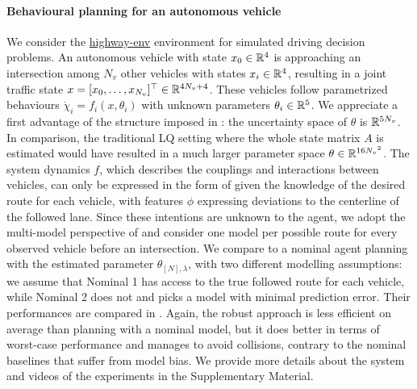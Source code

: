 \paragraph{Behavioural planning for an autonomous vehicle}
We consider the \href{https://github.com/eleurent/highway-env}{highway-env} environment \citep{highway-env} for simulated driving decision problems. An autonomous vehicle with state $x_0\in\mathbb{R}^4$ is approaching an intersection among ${N_v}$ other vehicles with states $x_i\in\mathbb{R}^4$, resulting in a joint traffic state $x = [x_0, \dots,x_{N_v}]^\top\in\mathbb{R}^{4{N_v}+4}$. These vehicles follow parametrized behaviours $\dot{\chi}_i=f_i(x,\theta_i)$ with unknown parameters $\theta_i\in\mathbb{R}^5$. We appreciate a first advantage of the structure imposed in : the uncertainty space of $\theta$ is $\mathbb{R}^{5{N_v}}$. In comparison, the traditional LQ setting where the whole state matrix $A$ is estimated would have resulted in a much larger parameter space $\theta\in\mathbb{R}^{16{N_v}^2}$.
The system dynamics $f$, which describes the couplings and interactions between vehicles, can only be expressed in the form of  given the knowledge of the desired route for each vehicle, with features $\phi$ expressing deviations to the centerline of the followed lane. Since these intentions are unknown to the agent, we adopt the multi-model perspective of  and consider one model per possible route for every observed vehicle before an intersection. We compare  to a nominal agent planning with the estimated parameter $\theta_{[N],\lambda}$, with two different modelling assumptions: we assume that Nominal 1 has access to the true followed route for each vehicle, while Nominal 2 does not and picks a model with minimal prediction error. Their performances are compared in . Again, the robust approach is less efficient on average than planning with a nominal model, but it does better in terms of worst-case performance and manages to avoid collisions, contrary to the nominal baselines that suffer from model bias. We provide more details about the system and videos of the experiments in the Supplementary Material.

